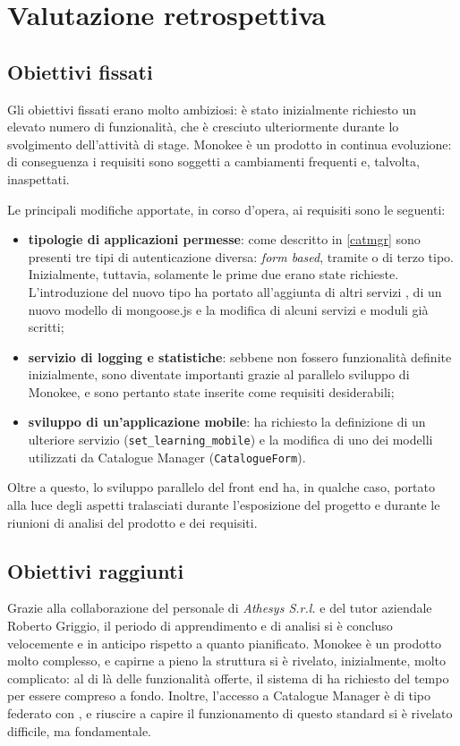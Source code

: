 \chapter{Valutazione retrospettiva} \label{conclusioni}

\section{Obiettivi fissati}
Gli obiettivi fissati erano molto ambiziosi: è stato inizialmente richiesto un elevato numero di funzionalità, che è cresciuto ulteriormente durante lo svolgimento dell'attività di stage. Monokee è un prodotto in continua evoluzione: di conseguenza i requisiti sono soggetti a cambiamenti frequenti e, talvolta, inaspettati. 

Le principali modifiche apportate, in corso d'opera, ai requisiti sono le seguenti:
\begin{itemize}
\item \textbf{tipologie di applicazioni permesse}: come descritto in \ref{catmgr} sono presenti tre tipi di autenticazione diversa: \textit{form based}, tramite  o di terzo tipo. Inizialmente, tuttavia, solamente le prime due erano state richieste. L'introduzione del nuovo tipo ha portato all'aggiunta di altri servizi , di un nuovo modello di mongoose.js e la modifica di alcuni servizi e moduli già scritti;
\item \textbf{servizio di logging e statistiche}: sebbene non fossero funzionalità definite inizialmente, sono diventate importanti grazie al parallelo sviluppo di Monokee, e sono pertanto state inserite come requisiti desiderabili;
\item \textbf{sviluppo di un'applicazione mobile}: ha richiesto la definizione di un ulteriore servizio  (\texttt{set\_learning\_mobile}) e la modifica di uno dei modelli utilizzati da Catalogue Manager (\texttt{CatalogueForm}). 
\end{itemize}
Oltre a questo, lo sviluppo parallelo del front end ha, in qualche caso, portato alla luce degli aspetti tralasciati durante l'esposizione del progetto e durante le riunioni di analisi del prodotto e dei requisiti.

\section{Obiettivi raggiunti}
Grazie alla collaborazione del personale di \textit{Athesys S.r.l.} e del tutor aziendale Roberto Griggio, il periodo di apprendimento e di analisi si è concluso velocemente e in anticipo rispetto a quanto pianificato. Monokee è un prodotto molto complesso, e capirne a pieno la struttura si è rivelato, inizialmente, molto complicato: al di là delle funzionalità offerte, il sistema di  ha richiesto del tempo per essere compreso a fondo. Inoltre, l'accesso a Catalogue Manager è di tipo federato con , e riuscire a capire il funzionamento di questo standard si è rivelato difficile, ma fondamentale.

